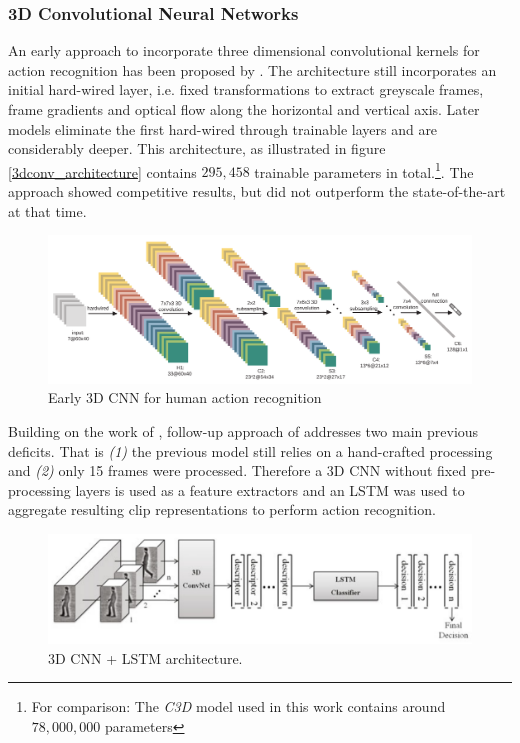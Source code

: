 \subsubsection{3D Convolutional Neural Networks}
An early approach to incorporate three dimensional convolutional kernels for action recognition has been proposed by \textcite{ji_3d_2013}.
The architecture still incorporates an initial hard-wired layer, i.e. fixed transformations to extract greyscale frames, frame gradients and optical flow along the horizontal and vertical axis.
Later models eliminate the first hard-wired through trainable layers and are considerably deeper.
This architecture, as illustrated in figure \ref{3dconv_architecture} contains $295,458$ trainable parameters in total.\footnote{For comparison: The \textit{C3D} model used in this work contains around $78,000,000$ parameters}.
The approach showed competitive results, but did not outperform the state-of-the-art at that time.

\begin{figure}[H]
    \centering
    \includegraphics[width=\textwidth]{img_related/3dconv_architecture}
    \caption{Early 3D CNN for human action recognition \cite{ji_3d_2013}}
    \label{fig:3dconv_architecture}
\end{figure}

Building on the work of \textcite{ji_3d_2013}, follow-up approach of \textcite{baccouche_sequential_2011} addresses two main previous deficits.
That is \textit{(1)} the previous model still relies on a hand-crafted processing and \textit{(2)} only 15 frames were processed.
Therefore a 3D CNN without fixed pre-processing layers is used as a feature extractors and an LSTM was used to aggregate resulting clip representations to perform action recognition.

\begin{figure}[H]
    \centering
    \includegraphics[width=\textwidth]{img_related/sequentialdeep_overview.png}
    \caption{3D CNN + LSTM architecture. \cite{baccouche_sequential_2011}}
    \label{fig:sequentialdeep_overview}
\end{figure}

